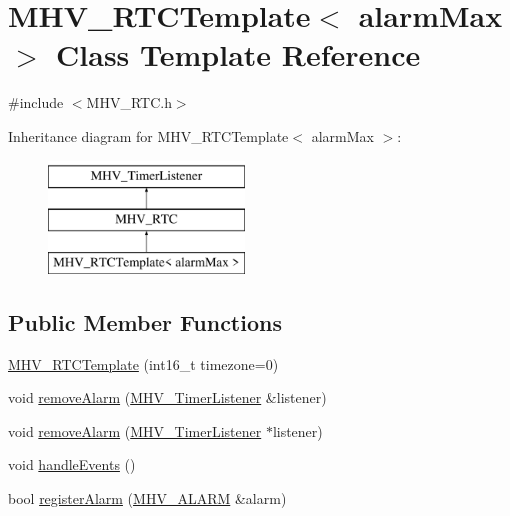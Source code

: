 \hypertarget{class_m_h_v___r_t_c_template}{
\section{\-M\-H\-V\-\_\-\-R\-T\-C\-Template$<$ alarm\-Max $>$ \-Class \-Template \-Reference}
\label{class_m_h_v___r_t_c_template}
}


{\ttfamily \#include $<$\-M\-H\-V\-\_\-\-R\-T\-C.\-h$>$}

\-Inheritance diagram for \-M\-H\-V\-\_\-\-R\-T\-C\-Template$<$ alarm\-Max $>$\-:\begin{figure}[H]
\begin{center}
\leavevmode
\includegraphics[height=3.000000cm]{class_m_h_v___r_t_c_template}
\end{center}
\end{figure}
\subsection*{\-Public \-Member \-Functions}
\begin{DoxyCompactItemize}
\item 
\hyperlink{class_m_h_v___r_t_c_template_a4aadb2bbb51ab6a367a36460e506152b}{\-M\-H\-V\-\_\-\-R\-T\-C\-Template} (int16\-\_\-t timezone=0)
\item 
void \hyperlink{class_m_h_v___r_t_c_template_a9c21b20f08d659d7fd23733178bf415e}{remove\-Alarm} (\hyperlink{class_m_h_v___timer_listener}{\-M\-H\-V\-\_\-\-Timer\-Listener} \&listener)
\item 
void \hyperlink{class_m_h_v___r_t_c_template_ac8b774085133a5d98ef507251232bb75}{remove\-Alarm} (\hyperlink{class_m_h_v___timer_listener}{\-M\-H\-V\-\_\-\-Timer\-Listener} $\ast$listener)
\item 
void \hyperlink{class_m_h_v___r_t_c_template_a7032d5ee95b422be71b7fa2c29853165}{handle\-Events} ()
\item 
bool \hyperlink{class_m_h_v___r_t_c_template_a500eed011af3dbe6b80487a498db262d}{register\-Alarm} (\hyperlink{_m_h_v___r_t_c_8h_af13307658f41fba330ffae04dd5cbce6}{\-M\-H\-V\-\_\-\-A\-L\-A\-R\-M} \&alarm)
\end{DoxyCompactItemize}
